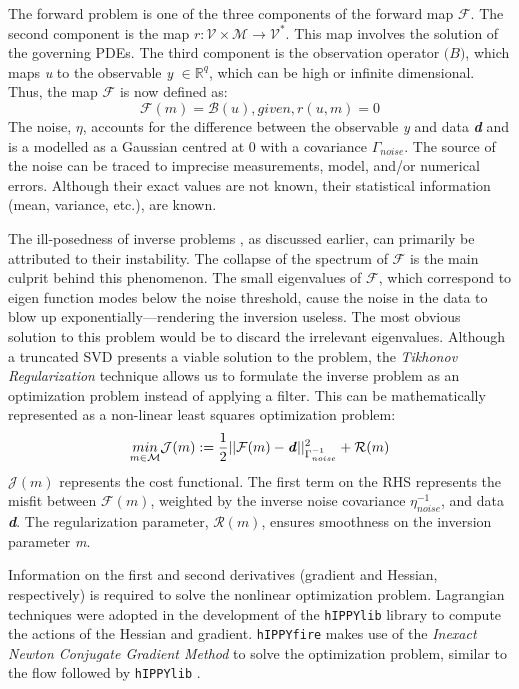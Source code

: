 The forward problem is one of the three components of the forward map $\mathcal{F}$. The second component is the map $r: \mathcal{V} \times \mathcal{M} \rightarrow \mathcal{V}^*$. This map involves the solution of the governing PDEs. The third component is the observation operator $\mathcal(B)$, which maps \textit{u} to the observable \textit{y} $\in \mathbb{R}^q$, which can be high or infinite dimensional. Thus, the map $\mathcal{F}$ is now defined as:
\begin{equation}
    \mathcal{F}(m) = \mathcal{B}(u), given, r(u, m) = 0
\end{equation}
The noise, $\eta$, accounts for the difference between the observable \textit{y} and data \textit{\textbf{d}} and is a modelled as a Gaussian centred at 0 with a covariance $\Gamma_{noise}$. The source of the noise can be traced to imprecise measurements, model, and/or numerical errors. Although their exact values are not known, their statistical information (mean, variance, etc.), are known.

The ill-posedness of inverse problems \cite{tikhonov1963solution}, as discussed earlier, can primarily be attributed to their instability. The collapse of the spectrum of $\mathcal{F}$ is the main culprit behind this phenomenon. The small eigenvalues of $\mathcal{F}$, which correspond to eigen function modes below the noise threshold, cause the noise in the data to blow up exponentially---rendering the inversion useless. The most obvious solution to this problem would be to discard the irrelevant eigenvalues. Although a truncated SVD presents a viable solution to the problem, the \textit{Tikhonov Regularization} technique \cite{golub1999tikhonov} allows us to formulate the inverse problem as an optimization problem instead of applying a filter. This can be mathematically represented as a non-linear least squares optimization problem:
\begin{equation}
\label{eqn:deterministic2}
    \underset{m \in \mathcal{M}}{min}\mathcal{J}(m) := \frac{1}{2} ||\mathcal{F}(m) - \textbf{\textit{d}} ||^2_{\Gamma^{-1}_{noise}} + \mathcal{R}(m)
\end{equation}
$\mathcal{J}(m)$ represents the cost functional. The first term on the RHS represents the misfit between $\mathcal{F}(m)$, weighted by the inverse noise covariance $\eta^{-1}_{noise}$, and data \textit{\textbf{d}}. The regularization parameter, $\mathcal{R}(m)$, ensures smoothness on the inversion parameter \textit{m}.

Information on the first and second derivatives (gradient and Hessian, respectively) is required to solve the nonlinear optimization problem. Lagrangian techniques \cite{troltzsch2010optimal} were adopted in the development of the \texttt{hIPPYlib} library \cite{villa2018hippylib} to compute the actions of the Hessian and gradient. \texttt{hIPPYfire} makes use of the \textit{Inexact Newton Conjugate Gradient Method} to solve the optimization problem, similar to the flow followed by \texttt{hIPPYlib} \cite{villa2018hippylib}.

